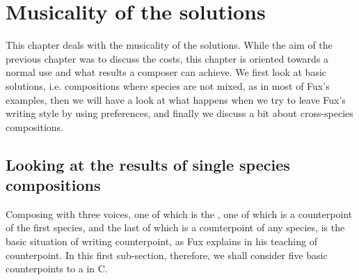 \chapter{Musicality of the solutions}\label{chapter:musicality}
This chapter deals with the musicality of the solutions. While the aim of the previous chapter was to discuss the costs, this chapter is oriented towards a normal use and what results a composer can achieve. We first look at basic solutions, i.e. compositions where species are not mixed, as in most of Fux's examples, then we will have a look at what happens when we try to leave Fux's writing style by using preferences, and finally we discuss a bit about cross-species compositions.

\section{Looking at the results of single species compositions}
Composing with three voices, one of which is the \cf, one of which is a counterpoint of the first species, and the last of which is a counterpoint of any species, is the basic situation of writing counterpoint, as Fux explains in his teaching of counterpoint. In this first sub-section, therefore, we shall consider five basic counterpoints to a \cfs in C.

